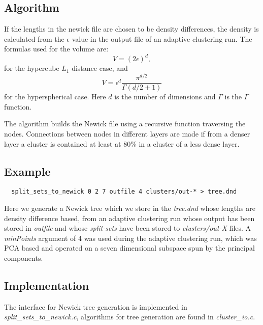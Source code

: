 \subsection{Algorithm}
If the lengths in the newick file are chosen to be density
differences, the density is calculated from the $\epsilon$ value in
the output file of an adaptive clustering run.
The formulas used for the volume are:
\begin{equation}
  V = (2\epsilon)^d,
\end{equation}
for the hypercube $L_1$ distance case, and
\begin{equation}
  V = \epsilon^{d}\frac{\pi^{d/2}}{\Gamma(d/2+1)}
\end{equation}
for the hyperspherical case. Here $d$ is the number of dimensions
and $\Gamma$ is the $\Gamma$ function.

The algorithm builds the Newick file using a recursive function traversing
the nodes. Connections between nodes in different layers are made
if from a denser layer a cluster is contained at least at 80\% in a
cluster of a less dense layer. 

\subsection{Example}

\begin{lstlisting}
  split_sets_to_newick 0 2 7 outfile 4 clusters/out-* > tree.dnd
\end{lstlisting}
Here we generate a Newick tree which we store in the \emph{tree.dnd}
whose lengths are density difference based, from an adaptive
clustering run whose output has been stored in \emph{outfile} and
whose \emph{split-sets} have been stored to \emph{clusters/out-X}
files. A \emph{minPoints} argument of 4 was used during the adaptive
clustering run, which was PCA based and operated on a seven
dimensional subspace spun by the principal components. 

\subsection{Implementation}
The interface for Newick tree generation is implemented in
\emph{split\_sets\_to\_newick.c}, algorithms for tree generation are
found in \emph{cluster\_io.c}.
